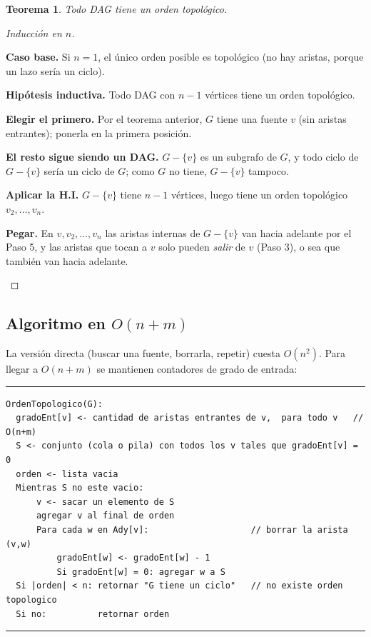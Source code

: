 \documentclass[11pt,a4paper]{article}
\theoremstyle{plain}
\newtheorem{teorema}{Teorema}[section]
\theoremstyle{definition}
\theoremstyle{remark}
\newcommand{\codigoinicio}{\begin{center}\begin{minipage}{0.93\textwidth}%
  \hrule\vspace{3pt}}
\newcommand{\codigofin}{\vspace{-4pt}\hrule\end{minipage}\end{center}}
\begin{document}
\begin{teorema}
Todo DAG tiene un orden topológico.
\end{teorema}
\begin{proof}[Inducción en $n$]
\begin{pasos}
\item \textbf{Caso base.} Si $n=1$, el único orden posible es topológico (no hay
aristas, porque un lazo sería un ciclo).
\item \textbf{Hipótesis inductiva.} Todo DAG con $n-1$ vértices tiene un orden
topológico.
\item \textbf{Elegir el primero.} Por el teorema anterior, $G$ tiene una fuente $v$
(sin aristas entrantes); ponerla en la primera posición.
\item \textbf{El resto sigue siendo un DAG.} $G-\{v\}$ es un subgrafo de $G$, y todo
ciclo de $G-\{v\}$ sería un ciclo de $G$; como $G$ no tiene, $G-\{v\}$ tampoco.
\item \textbf{Aplicar la H.I.} $G-\{v\}$ tiene $n-1$ vértices, luego tiene un orden
topológico $v_2,\dots,v_n$.
\item \textbf{Pegar.} En $v,v_2,\dots,v_n$ las aristas internas de $G-\{v\}$ van hacia
adelante por el Paso 5, y las aristas que tocan a $v$ solo pueden \emph{salir} de $v$
(Paso 3), o sea que también van hacia adelante. \qedhere
\end{pasos}
\end{proof}

\subsection{Algoritmo en $O(n+m)$}

La versión directa (buscar una fuente, borrarla, repetir) cuesta $O(n^2)$. Para llegar
a $O(n+m)$ se mantienen contadores de grado de entrada:

\codigoinicio
\begin{verbatim}
OrdenTopologico(G):
  gradoEnt[v] <- cantidad de aristas entrantes de v,  para todo v   // O(n+m)
  S <- conjunto (cola o pila) con todos los v tales que gradoEnt[v] = 0
  orden <- lista vacia
  Mientras S no este vacio:
      v <- sacar un elemento de S
      agregar v al final de orden
      Para cada w en Ady[v]:                    // borrar la arista (v,w)
          gradoEnt[w] <- gradoEnt[w] - 1
          Si gradoEnt[w] = 0: agregar w a S
  Si |orden| < n: retornar "G tiene un ciclo"   // no existe orden topologico
  Si no:          retornar orden
\end{verbatim}
\codigofin
\end{document}
